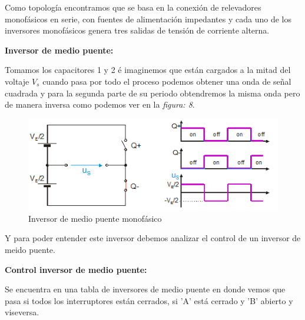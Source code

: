 \documentclass[a3paper,12pt]{article}
\begin{document}
{\begin{flushleft}
\begin{LARGE}
\begin{Huge}
\end{Huge} 
Como topología encontramos que se basa en la conexión de relevadores monofásicos en serie, con fuentes de alimentación impedantes y cada uno de los inversores monofásicos genera tres salidas de tensión de corriente alterna.\\ 
\vspace{.7cm}
\begin{Huge}
	\hspace{3cm} \textbf{Inversor de medio puente: }\\
		\vspace{.3cm}
\end{Huge} 		
Tomamos los capacitores 1 y 2 é imaginemos que están cargados a la mitad del voltaje  $V_s$ cuando pasa por todo el proceso podemos obtener una onda de señal cuadrada y para la segunda parte de su periodo obtendremos la misma onda pero de manera inversa como podemos ver en la \textit{figura: 8}.\\
\vspace{.8cm}
\begin{figure}[hbtp]
\centering
\includegraphics[scale=1]{Inversormediopuente.png}
\caption{Inversor de medio puente monofásico}
\end{figure}

Y para poder entender este inversor debemos analizar el control de un inversor de meido puente.\\

\begin{Huge}
	\hspace{3cm} \textbf{Control inversor de medio puente: }\\
		\vspace{.3cm}
\end{Huge} 
Se encuentra en una tabla de inversores de medio puente en donde vemos que pasa si todos los interruptores están cerrados, si 'A' está cerrado y 'B' abierto y viseversa. 


\end{LARGE}		 				 		
		 	

\end{flushleft}

}
\end{document}
